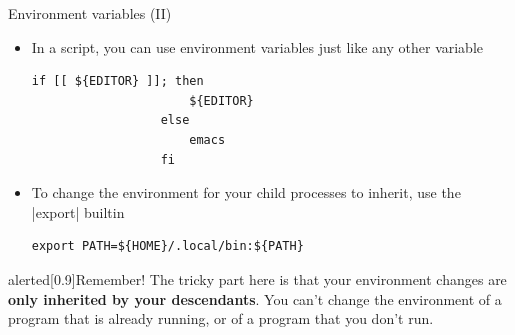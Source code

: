 \begin{frame}[fragile]{Environment variables (II)}
    \vspace{-1mm}
    \begin{itemize}
        \item In a script, you can use environment variables just like any other variable
              \begin{lstlisting}[style=MyBash, numbers=none, aboveskip=2mm, belowskip=-4mm, xrightmargin=30mm]
                  if [[ ${EDITOR} ]]; then
                      ${EDITOR}
                  else
                      emacs
                  fi
              \end{lstlisting}
        \item To change the environment \alert{for your child processes} to inherit, use the \bash|export| builtin
              \begin{lstlisting}[style=MyBash, numbers=none, aboveskip=2mm, xrightmargin=30mm]
                  export PATH=${HOME}/.local/bin:${PATH}
              \end{lstlisting}
    \end{itemize}
    \begin{varblock}{alerted}[0.9\textwidth]{Remember!}
        The tricky part here is that your environment changes are \alert{\textbf{only inherited by your descendants}}.
        You can't change the environment of a program that is already running, or of a program that you don't run.
    \end{varblock}
\end{frame}
